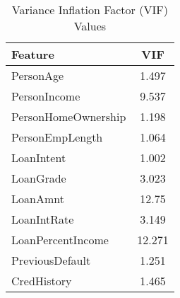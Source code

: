 \begin{table}[H]\centering
\caption{Variance Inflation Factor (VIF) Values}
\label{Table 4:vif_values}
\begin{tabular}{lc}
\toprule
Feature & VIF \\
\midrule
PersonAge & 1.497 \\
PersonIncome & 9.537 \\
PersonHomeOwnership & 1.198 \\
PersonEmpLength & 1.064 \\
LoanIntent & 1.002 \\
LoanGrade & 3.023 \\
LoanAmnt & 12.75 \\
LoanIntRate & 3.149 \\
LoanPercentIncome & 12.271 \\
PreviousDefault & 1.251 \\
CredHistory & 1.465 \\
\bottomrule
\end{tabular}
\end{table}
